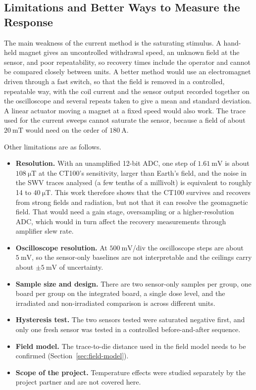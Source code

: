 \documentclass[12pt,a4paper]{article}
\begin{document}
\subsection{Limitations and Better Ways to Measure the Response}
\label{sec:disc-limitations}

The main weakness of the current method is the saturating stimulus. A hand-held magnet gives an uncontrolled withdrawal speed, an unknown field at the sensor, and poor repeatability, so recovery times include the operator and cannot be compared closely between units. A better method would use an electromagnet driven through a fast switch, so that the field is removed in a controlled, repeatable way, with the coil current and the sensor output recorded together on the oscilloscope and several repeats taken to give a mean and standard deviation. A linear actuator moving a magnet at a fixed speed would also work. The trace used for the current sweeps cannot saturate the sensor, because a field of about $\SI{20}{\milli\tesla}$ would need on the order of $\SI{180}{\ampere}$.

Other limitations are as follows.
\begin{itemize}
\item \textbf{Resolution.} With an unamplified 12-bit ADC, one step of $\SI{1.61}{\milli\volt}$ is about $\SI{108}{\micro\tesla}$ at the CT100's sensitivity, larger than Earth's field, and the noise in the SWV traces analysed (a few tenths of a millivolt) is equivalent to roughly 14 to $\SI{40}{\micro\tesla}$. This work therefore shows that the CT100 survives and recovers from strong fields and radiation, but not that it can resolve the geomagnetic field. That would need a gain stage, oversampling or a higher-resolution ADC, which would in turn affect the recovery measurements through amplifier slew rate.
\item \textbf{Oscilloscope resolution.} At $\SI{500}{\milli\volt}$/div the oscilloscope steps are about $\SI{5}{\milli\volt}$, so the sensor-only baselines are not interpretable and the ceilings carry about $\pm\SI{5}{\milli\volt}$ of uncertainty.
\item \textbf{Sample size and design.} There are two sensor-only samples per group, one board per group on the integrated board, a single dose level, and the irradiated and non-irradiated comparison is across different units.
\item \textbf{Hysteresis test.} The two sensors tested were saturated negative first, and only one fresh sensor was tested in a controlled before-and-after sequence.
\item \textbf{Field model.} The trace-to-die distance used in the field model needs to be confirmed (Section~\ref{sec:field-model}).
\item \textbf{Scope of the project.} Temperature effects were studied separately by the project partner and are not covered here.
\end{itemize}
\end{document}

